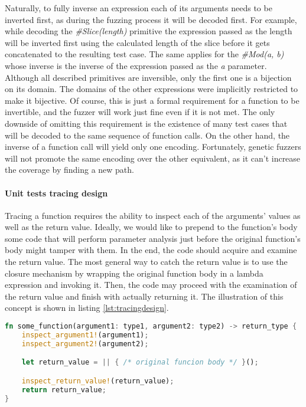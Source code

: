 Naturally, to fully inverse an expression each of its arguments needs to be inverted first, as during the fuzzing process it will be decoded first. For example, while decoding the \textit{\#Slice(length)} primitive the expression passed as the length will be inverted first using the calculated length of the slice before it gets concatenated to the resulting test case. The same applies for the \textit{\#Mod(a, b)} whose inverse is the inverse of the expression passed as the \textit{a} parameter. Although all described primitives are inversible, only the first one is a bijection on its domain. The domains of the other expressions were implicitly restricted to make it bijective. Of course, this is just a formal requirement for a function to be invertible, and the fuzzer will work just fine even if it is not met. The only downside of omitting this requirement is the existence of many test cases that will be decoded to the same sequence of function calls. On the other hand, the inverse of a function call will yield only one encoding. Fortunately, genetic fuzzers will not promote the same encoding over the other equivalent, as it can't increase the coverage by finding a new path. 


\paragraph{Unit tests tracing design}
Tracing a function requires the ability to inspect each of the arguments' values as well as the return value. Ideally, we would like to prepend to the function's body some code that will perform parameter analysis just before the original function's body might tamper with them. In the end, the code should acquire and examine the return value. The most general way to catch the return value is to use the closure mechanism by wrapping the original function body in a lambda expression and invoking it. Then, the code may proceed with the examination of the return value and finish with actually returning it. The illustration of this concept is shown in listing \ref{lst:tracingdesign}.

\begin{minipage}{\linewidth}
\begin{lstlisting}[language=rust,caption={Unit tests tracing design.},label={lst:tracingdesign}]
fn some_function(argument1: type1, argument2: type2) -> return_type {
    inspect_argument1!(argument1);
    inspect_argument2!(argument2);

    let return_value = || { /* original funcion body */ }();

    inspect_return_value!(return_value);
    return return_value;
}
\end{lstlisting}
\end{minipage}

